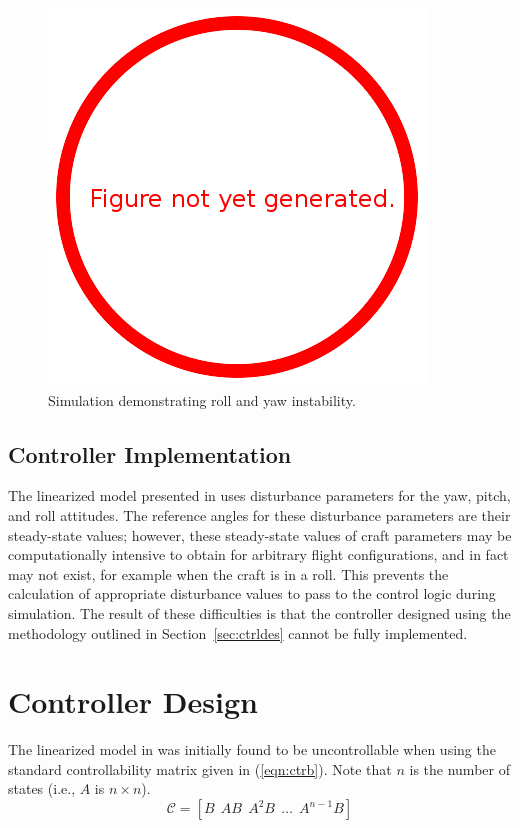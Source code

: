 \documentclass{sydeStyle}
\begin{document}
\begin{figure}
    \begin{center}
        \includegraphics{figs/todo}
    \end{center}
    \caption{Simulation demonstrating roll and yaw instability.}
    \label{fig:rollinstability}
\end{figure}

\subsection{Controller Implementation}
\label{sec:ctrlimpl}
The linearized model presented in \cite{spottiswoode} uses disturbance
parameters for the yaw, pitch, and roll attitudes.  The reference angles for
these disturbance parameters are their steady-state values; however, these
steady-state values of craft parameters may be computationally
intensive to obtain for arbitrary flight configurations, and in fact may not
exist, for example when the craft is in a roll.
This prevents the calculation of appropriate disturbance values to
pass to the control logic during simulation.  The result of these difficulties
is that the controller designed using the methodology outlined in
Section~\ref{sec:ctrldes} cannot be fully implemented.

\section{Controller Design}
The linearized model in \cite{spottiswoode} was initially found to be
uncontrollable when using the standard controllability matrix given in
(\ref{eqn:ctrb}).  Note that $n$ is the number of states (i.e., $A$ is $n \times
n$).
\begin{equation}
    \mathcal{C} = [B \;\, AB \;\, A^2B \;\, \ldots \;\, A^{n-1}B]
    \label{eqn:ctrb}
\end{equation}
\end{document}
